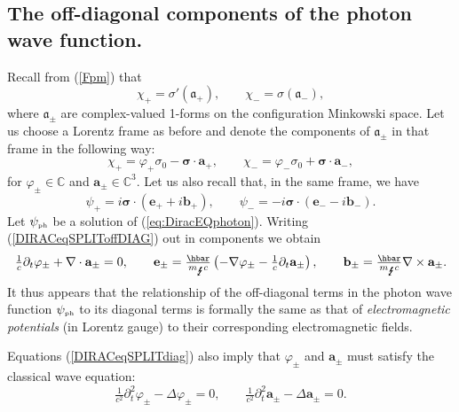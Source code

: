 \documentclass[11pt]{article}
\theoremstyle{definition}
\newcommand{\refeq}[1]{(\ref{#1})}
\numberwithin{equation}{section}
\newcommand{\fa}{\mathfrak{a}}
\newcommand{\bb}{\mathbf{b}}
\newcommand{\ba}{\mathbf{a}}
\newcommand{\bfa}{\boldsymbol{\fa}}
\newcommand{\be}{\mathbf{e}}
\newcommand{\beq}{\begin{equation}}
\newcommand{\eeq}{\end{equation}}
\newcommand{\p}{\partial}
\newcommand{\siV}{\boldsymbol{\sigma}}
\newcommand{\psiPH}{{\psi_{\mbox{\rm\tiny ph}}}}
\newcommand{\mPH}{{m_{\mbox{\Lightning}}}}
\newcommand{\Cset}{{\mathbb C}}
\newcommand{\si}{\sigma}
\newcommand{\nab}{\nabla}
\begin{document}
\subsection{The off-diagonal components of the photon wave function.}\label{sec:offdiag}
 Recall from \refeq{Fpm} that 
\beq
\chi_+ = \si'(\bfa_+),\qquad \chi_- = \si(\bfa_-),
\eeq
where $\bfa_\pm$ are complex-valued 1-forms on the configuration Minkowski space. 
 Let us choose a Lorentz frame as before and denote the components of $\bfa_\pm$ in that frame in the following way:
\beq\label{eq:insidechi}
\chi_+ = \varphi_+\si_0 - \siV \cdot \ba_+,\qquad \chi_- = \varphi_- \si_0 + \siV \cdot \ba_-,
\eeq
 for $\varphi_\pm \in \Cset$ and $\ba_\pm \in \Cset^3$. 
 Let us also recall that, in the same frame, we have
\beq\label{eq:insidepsi}
\psi_+ = i \siV \cdot (\be_+ + i \bb_+),\qquad \psi_- = - i \siV \cdot (\be_- - i \bb_-).
\eeq
  Let $\psiPH$ be a solution of \refeq{eq:DiracEQphoton}. 
 Writing \refeq{DIRACeqSPLIToffDIAG} out in components we obtain
\beq\label{eq:potentials}
\tfrac{1}{c}\p_t \varphi_\pm + \nab \cdot \ba_\pm = 0,
\qquad  
\be_\pm = \tfrac{\hbar}{\mPH c} \left(-\nab \varphi_\pm - \tfrac{1}{c}\p_t \ba_\pm\right),
\qquad 
\bb_\pm = \tfrac{\hbar}{\mPH c} \nab\times \ba_\pm.
\eeq
It thus appears that the relationship of the off-diagonal terms in the photon wave function 
 $\psiPH$ to its diagonal terms is formally the same as that of {\em electromagnetic potentials} 
(in Lorentz gauge) to their corresponding electromagnetic fields.  

Equations \refeq{DIRACeqSPLITdiag} also imply that $\varphi_\pm$ and $\ba_\pm$ must satisfy the classical wave equation: 
\beq\label{eq:waves}
\tfrac{1}{c^2} \p_t^2 \varphi_\pm - \Delta \varphi_\pm = 0,\qquad \tfrac{1}{c^2} \p_t^2 \ba_\pm - \Delta \ba_\pm = 0.
\eeq
\end{document}
